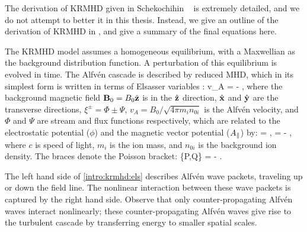     The derivation of KRMHD given in Schekochihin \etal\ \cite{tome} is extremely detailed, and we
    do not attempt to better it in this thesis. Instead, we give an outline of the
    derivation of KRMHD in , and give a summary of the final equations here.
    
    The KRMHD model assumes a homogeneous equilibrium, with a Maxwellian as the background
    distribution function. A perturbation of this equilibrium is evolved in time. 
    The Alfv\'{e}n cascade is described by reduced MHD,
    which in its simplest form is written in terms of Elsasser variables \cite{elsasser50}:
    \beq
     \mp v_A  = -  , \label{intro:krmhd:els} 
    \eeq
    where the background magnetic field $\mathbf{B}_0 = B_0\hat{\mathbf{z}}$ is in the
    $\hat{\mathbf{z}}$ direction, $\hat{\mathbf{x}}$ and $\hat{\mathbf{y}}$ are the transverse directions,
    $\xi^\pm = \Phi \pm \Psi$, $v_A = B_0/\sqrt{4 \pi m_i n_{0i}}$ is the Alfv\'{e}n
    velocity, and $\Phi$ and $\Psi$ are stream and flux functions
    respectively, which are related to the electrostatic potential ($\phi$) and the magnetic vector
    potential ($A_\parallel$) by:
    \beq
        \Phi = \phi, \quad \Psi = - 
        \label{intro:eq:PhiPsi},
    \eeq
    where $c$ is speed of light,
    $m_i$ is the ion mass, and $n_{0i}$ is the background ion density.
    The braces denote the Poisson bracket:
    \beq
        \lt\{P,Q\rt\} =  -  .
    \eeq

    The left hand side of \eqref{intro:krmhd:els} describes Alfv\'{e}n wave packets,
    traveling up or down the field line. The nonlinear interaction between these wave
    packets is captured by
    the right hand side. Observe that only counter-propagating Alfv\'{e}n waves interact
    nonlinearly; these counter-propagating Alfv\'{e}n waves give rise to the turbulent cascade by
    transferring energy to smaller spatial scales.

